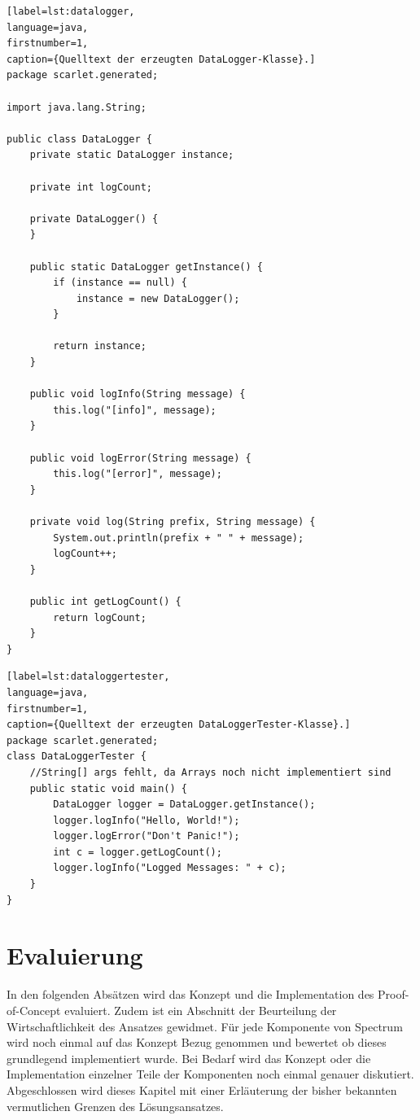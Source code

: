 \documentclass[12pt,oneside,a4paper,parskip]{scrbook}
\begin{document}
\begin{lstlisting}[label=lst:datalogger,
language=java,
firstnumber=1,
caption={Quelltext der erzeugten DataLogger-Klasse}.]
package scarlet.generated;

import java.lang.String;

public class DataLogger {
	private static DataLogger instance;
	
	private int logCount;
	
	private DataLogger() {
	}

	public static DataLogger getInstance() {
		if (instance == null) {
			instance = new DataLogger();
		}

		return instance;
	}

	public void logInfo(String message) {
		this.log("[info]", message);
	}
	
	public void logError(String message) {
		this.log("[error]", message);
	}
	
	private void log(String prefix, String message) {
		System.out.println(prefix + " " + message);
		logCount++;
	}
	
	public int getLogCount() {
		return logCount;
	}
}
\end{lstlisting}
\newpage
\begin{lstlisting}[label=lst:dataloggertester,
language=java,
firstnumber=1,
caption={Quelltext der erzeugten DataLoggerTester-Klasse}.]
package scarlet.generated;
class DataLoggerTester {
	//String[] args fehlt, da Arrays noch nicht implementiert sind
	public static void main() {
		DataLogger logger = DataLogger.getInstance();
		logger.logInfo("Hello, World!");
		logger.logError("Don't Panic!");
		int c = logger.getLogCount();
		logger.logInfo("Logged Messages: " + c);
	}
}
\end{lstlisting}

\chapter{Evaluierung}

In den folgenden Absätzen wird das Konzept und die Implementation des Proof-of-Concept evaluiert. Zudem ist ein Abschnitt der Beurteilung der Wirtschaftlichkeit des Ansatzes gewidmet. Für jede Komponente von Spectrum wird noch einmal auf das Konzept Bezug genommen und bewertet ob dieses grundlegend implementiert wurde. Bei Bedarf wird das Konzept oder die Implementation einzelner Teile der Komponenten noch einmal genauer diskutiert. Abgeschlossen wird dieses Kapitel mit einer Erläuterung der bisher bekannten vermutlichen Grenzen des Lösungsansatzes.
\end{document}
